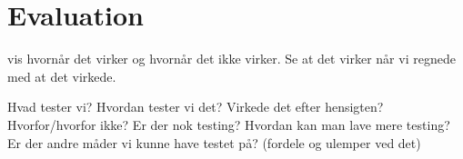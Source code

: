 
\section{Evaluation}

vis hvornår det virker og hvornår det ikke virker. 
Se at det virker når vi regnede med at det virkede.

Hvad tester vi?
Hvordan tester vi det?
Virkede det efter hensigten?
Hvorfor/hvorfor ikke?
Er der nok testing?
Hvordan kan man lave mere testing?
Er der andre måder vi kunne have testet på? (fordele og ulemper ved det)
